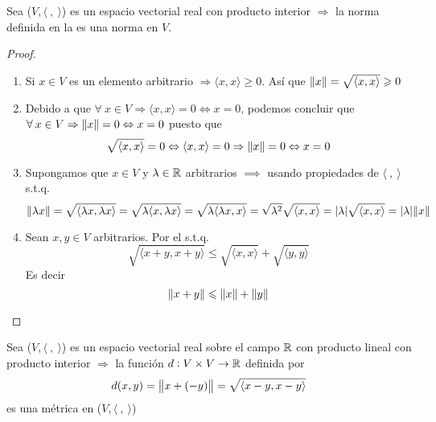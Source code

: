 \begin{theorem}
     Sea ($V, \langle \: , \: \rangle$) es un espacio vectorial real con producto interior $\Rightarrow$ la norma definida en la  es una norma en $V$.
    
\end{theorem}

\begin{proof}
    \begin{enumerate}[label=(\subscript{N}{{\arabic*}})]
    \item Si $x \in V$ es un elemento arbitrario $\Rightarrow \langle x, x \rangle \geqslant 0$. Así que $\norm{x} = \sqrt{\langle x,x \rangle} \geqslant 0$
    \item Debido a que $\forall \: x \in V \Rightarrow \langle x, x \rangle = 0 \iff x = 0$, podemos concluir que $\forall \: x \in V \Rightarrow \norm{x} = 0 \Leftrightarrow x = 0$ puesto que 
    \begin{equation*}
        \sqrt{\langle x,x \rangle} = 0 \Leftrightarrow \langle x,x \rangle = 0 \Rightarrow \norm{x} = 0 \Leftrightarrow x = 0
    \end{equation*}
    \item Supongamos que $x \in V$ y $\lambda \in \mathbb{R}$ arbitrarios $\implies$ usando propiedades de $\langle \: , \: \rangle$ s.t.q.
    \begin{equation*}
        \norm{\lambda x} = \sqrt{\langle \lambda x,\lambda x \rangle} = \sqrt{\lambda  \langle x, \lambda  x \rangle} = \sqrt{\lambda  \langle \lambda x,   x \rangle} = \sqrt{\lambda^2} \sqrt{\langle x,x \rangle} = \abs{\lambda} \sqrt{\langle x,x \rangle} = \abs{\lambda} \norm{x}
    \end{equation*}
    \item Sean $x,y \in V$ arbitrarios. Por el  s.t.q.
    \begin{equation*}
        \sqrt{\langle x + y, x + y \rangle} \leqslant \sqrt{\langle x,x \rangle} + \sqrt{\langle y,y \rangle}
    \end{equation*}
    Es decir
    \begin{equation*}
        \norm{x+y} \leqslant \norm{x} + \norm{y}
    \end{equation*}
    \end{enumerate}
\end{proof}

\begin{corollary}
    Sea ($V, \langle \: , \: \rangle$) es un espacio vectorial real sobre el campo $\mathbb{R}$ con producto lineal con producto interior $\Rightarrow$ la función $d : V \times V \to \mathbb{R}$ definida por
    \begin{equation*}
        d(x,y) = \norm{x+(-y)} = \sqrt{\langle x - y, x - y \rangle}
    \end{equation*}
    es una métrica en ($V, \langle \: , \: \rangle$)
\end{corollary}

